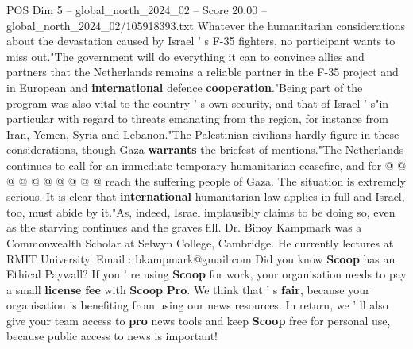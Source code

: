 \begin{textsample}{POS Dim 5 – global\_north\_2024\_02 – Score 20.00 – global\_north\_2024\_02/105918393.txt}
Whatever the humanitarian considerations about the devastation caused by Israel ' s F-35 fighters, no participant wants to miss out."The government will do everything it can to convince allies and partners that the Netherlands remains a reliable partner in the F-35 project and in European and \textbf{international} defence \textbf{cooperation}."Being part of the program was also vital to the country ' s own security, and that of Israel ' s"in particular with regard to threats emanating from the region, for instance from Iran, Yemen, Syria and Lebanon."The Palestinian civilians hardly figure in these considerations, though Gaza \textbf{warrants} the briefest of mentions."The Netherlands continues to call for an immediate temporary humanitarian ceasefire, and for @ @ @ @ @ @ @ @ @ @ reach the suffering people of Gaza.
The situation is extremely serious.
It is clear that \textbf{international} humanitarian law applies in full and Israel, too, must abide by it."As, indeed, Israel implausibly claims to be doing so, even as the starving continues and the graves fill.
Dr.
Binoy Kampmark was a Commonwealth Scholar at Selwyn College, Cambridge.
He currently lectures at RMIT University.
Email : bkampmark@gmail.com Did you know \textbf{Scoop} has an Ethical Paywall?
If you ' re using \textbf{Scoop} for work, your organisation needs to pay a small \textbf{license} \textbf{fee} with \textbf{Scoop} \textbf{Pro}.
We think that ' s \textbf{fair}, because your organisation is benefiting from using our news resources.
In return, we ' ll also give your team access to \textbf{pro} news tools and keep \textbf{Scoop} free for personal use, because public access to news is important!

\end{textsample}
